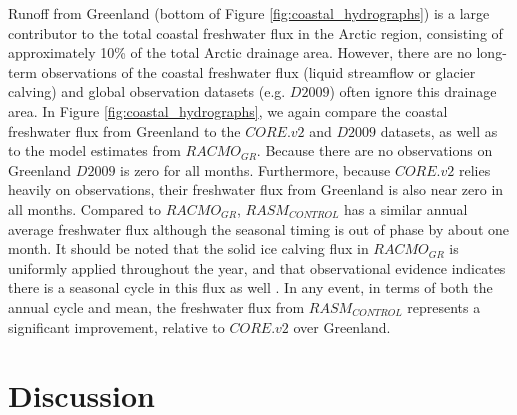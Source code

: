 \documentclass[jgrga, draft]{agutex}
\begin{document}
\begin{article}
Runoff from Greenland (bottom of Figure \ref{fig:coastal_hydrographs}) is a large contributor to the total coastal freshwater flux in the Arctic region, consisting of approximately 10\% of the total Arctic drainage area.
However, there are no long-term observations of the coastal freshwater flux (liquid streamflow or glacier calving) and global observation datasets (e.g. $D2009$) often ignore this drainage area.
In Figure \ref{fig:coastal_hydrographs}, we again compare the coastal freshwater flux from Greenland to the $CORE.v2$ and $D2009$ datasets, as well as to the model estimates from $RACMO_{GR}$.
Because there are no observations on Greenland $D2009$ is zero for all months.
Furthermore, because $CORE.v2$ relies heavily on observations, their freshwater flux from Greenland is also near zero in all months.
Compared to $RACMO_{GR}$, $RASM_{CONTROL}$ has a similar annual average freshwater flux although the seasonal timing is out of phase by about one month.
It should be noted that the solid ice calving flux in $RACMO_{GR}$ is uniformly applied throughout the year, and that observational evidence  indicates there is a seasonal cycle in this flux as well \citep[e.g.][]{Joughin_2008}.
In any event, in terms of both the annual cycle and mean, the freshwater flux from $RASM_{CONTROL}$ represents a significant improvement, relative to $CORE.v2$ over Greenland.

\section{Discussion}
\label{sec:discussion}


\end{article}
\end{document}
